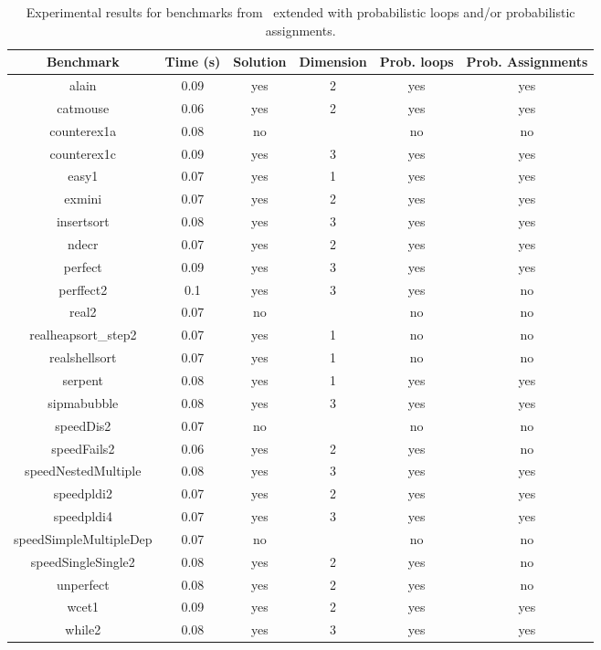 \begin{center}
\begin{table}[]
  \centering
   \begin{tabular}{c|c|c|c|c|c}
    
   {Benchmark} & {Time (s)} & {Solution} & {Dimension} & {Prob. loops} & {Prob. Assignments} \\\hline
{alain} & {0.09} & {yes} & {2} & {yes} & {yes} \\\hline
{catmouse} & {0.06} & {yes} & {2} & {yes} & {yes} \\\hline
{counterex1a} & {0.08} & {no} & {} & {no} & {no} \\\hline
{counterex1c} & {0.09} & {yes} & {3} & {yes} & {yes} \\\hline
{easy1} & {0.07} & {yes} & {1} & {yes} & {yes} \\\hline
{exmini} & {0.07} & {yes} & {2} & {yes} & {yes} \\\hline
{insertsort} & {0.08} & {yes} & {3} & {yes} & {yes} \\\hline
{ndecr} & {0.07} & {yes} & {2} & {yes} & {yes} \\\hline
{perfect} & {0.09} & {yes} & {3} & {yes} & {yes} \\\hline
{perffect2} & {0.1} & {yes} & {3} & {yes} & {no} \\\hline
{real2} & {0.07} & {no} & {} & {no} & {no} \\\hline
{realheapsort\_step2} & {0.07} & {yes} & {1} & {no} & {no} \\\hline
{realshellsort} & {0.07} & {yes} & {1} & {no} & {no} \\\hline
{serpent} & {0.08} & {yes} & {1} & {yes} & {yes} \\\hline
{sipmabubble} & {0.08} & {yes} & {3} & {yes} & {yes} \\\hline
{speedDis2} & {0.07} & {no} & {} & {no} & {no
} \\\hline
{speedFails2} & {0.06} & {yes} & {2} & {yes} & {no} \\\hline
{speedNestedMultiple} & {0.08} & {yes} & {3} & {yes} & {yes} \\\hline
{speedpldi2} & {0.07} & {yes} & {2} & {yes} & {yes} \\\hline
{speedpldi4} & {0.07} & {yes} & {3} & {yes} & {yes} \\\hline
{speedSimpleMultipleDep} & {0.07} & {no} & {} & {no} & {no} \\\hline
{speedSingleSingle2} & {0.08} & {yes} & {2} & {yes} & {no} \\\hline
{unperfect} & {0.08} & {yes} & {2} & {yes} & {no} \\\hline
{wcet1} & {0.09} & {yes} & {2} & {yes} & {yes} \\\hline
{while2} & {0.08} & {yes} & {3} & {yes} & {yes} \\\hline
    
\end{tabular}
\caption{Experimental results for benchmarks from~\cite{ADFG10:lexicographic} extended with probabilistic loops and/or probabilistic assignments.} \label{tab:exp1}
\end{table}
\end{center}

